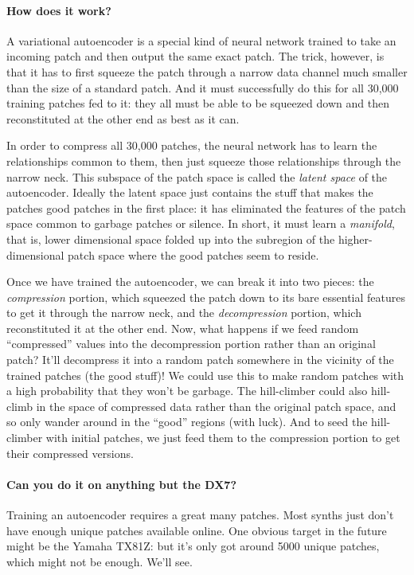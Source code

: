 \documentclass{article}
\begin{document}
\paragraph{How does it work?}  A variational autoencoder is a special kind of neural network trained to take an incoming patch and then output the same exact patch.  The trick, however, is that it has to first squeeze the patch through a narrow data channel much smaller than the size of a standard patch.  And it must successfully do this for all 30,000 training patches fed to it: they all must be able to be squeezed down and then reconstituted at the other end as best as it can.

In order to compress all 30,000 patches, the neural network has to learn the relationships common to them, then just squeeze those relationships through the narrow neck.  This subspace of the patch space is called the {\it latent space} of the autoencoder.  Ideally the latent space just contains the stuff that makes the patches good patches in the first place: it has eliminated the features of the patch space common to garbage patches or silence.  In short, it must learn a {\it manifold}, that is, lower dimensional space folded up into the subregion of the higher-dimensional patch space where the good patches seem to reside.

Once we have trained the autoencoder, we can break it into two pieces: the {\it compression} portion, which squeezed the patch down to its bare essential features to get it through the narrow neck, and the {\it decompression} portion, which reconstituted it at the other end.  Now, what happens if we feed random ``compressed'' values into the decompression portion rather than an original patch?  It'll decompress it into a random patch somewhere in the vicinity of the trained patches (the good stuff)!  We could use this to make random patches with a high probability that they won't be garbage.  The hill-climber could also hill-climb in the space of compressed data rather than the original patch space, and so only wander around in the ``good'' regions (with luck).  And to seed the hill-climber with initial patches, we just feed them to the compression portion to get their compressed versions.

\paragraph{Can you do it on anything but the DX7?} Training an autoencoder requires a great many patches.  Most synths just don't have enough unique patches available online.  One obvious target in the future might be the Yamaha TX81Z: but it's only got around 5000 unique patches, which might not be enough.  We'll see.
 
\end{document}
